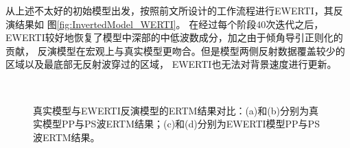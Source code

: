 从上述不太好的初始模型出发，按照前文所设计的工作流程进行EWERTI，其反演结果如
图\ref{fig:InvertedModel_WERTI}。
在经过每个阶段40次迭代之后，EWERTI较好地恢复了模型中深部的中低波数成分，加之由于倾角导引正则化的贡献，
反演模型在宏观上与真实模型更吻合。但是模型两侧反射数据覆盖较少的区域以及最底部无反射波穿过的区域，
EWERTI也无法对背景速度进行更新。
\begin{figure}[!htb]
   \centering
   \\
   \caption{真实模型与EWERTI反演模型的ERTM结果对比：(a)和(b)分别为真实模型PP与PS波ERTM结果；(c)和(d)分别为EWERTI模型PP与PS波ERTM结果。}
   \label{fig:ERTM_comparison}
\end{figure}
